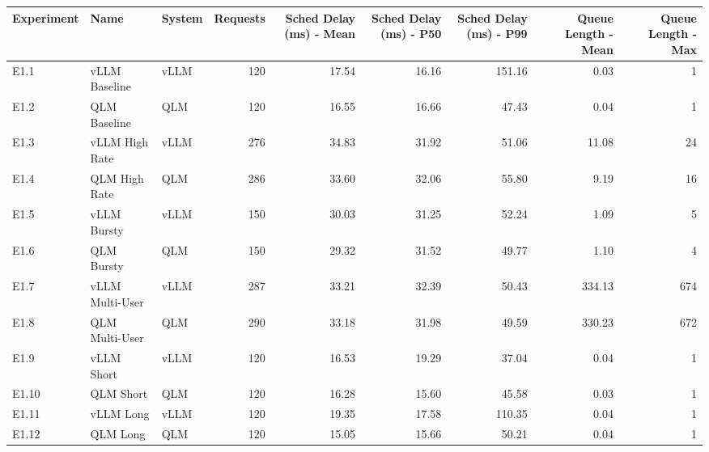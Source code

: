 \begin{tabular}{lllrrrrrr}
\toprule
Experiment & Name & System & Requests & Sched Delay (ms) - Mean & Sched Delay (ms) - P50 & Sched Delay (ms) - P99 & Queue Length - Mean & Queue Length - Max \\
\midrule
E1.1 & vLLM Baseline & vLLM & 120 & 17.54 & 16.16 & 151.16 & 0.03 & 1 \\
E1.2 & QLM Baseline & QLM & 120 & 16.55 & 16.66 & 47.43 & 0.04 & 1 \\
E1.3 & vLLM High Rate & vLLM & 276 & 34.83 & 31.92 & 51.06 & 11.08 & 24 \\
E1.4 & QLM High Rate & QLM & 286 & 33.60 & 32.06 & 55.80 & 9.19 & 16 \\
E1.5 & vLLM Bursty & vLLM & 150 & 30.03 & 31.25 & 52.24 & 1.09 & 5 \\
E1.6 & QLM Bursty & QLM & 150 & 29.32 & 31.52 & 49.77 & 1.10 & 4 \\
E1.7 & vLLM Multi-User & vLLM & 287 & 33.21 & 32.39 & 50.43 & 334.13 & 674 \\
E1.8 & QLM Multi-User & QLM & 290 & 33.18 & 31.98 & 49.59 & 330.23 & 672 \\
E1.9 & vLLM Short & vLLM & 120 & 16.53 & 19.29 & 37.04 & 0.04 & 1 \\
E1.10 & QLM Short & QLM & 120 & 16.28 & 15.60 & 45.58 & 0.03 & 1 \\
E1.11 & vLLM Long & vLLM & 120 & 19.35 & 17.58 & 110.35 & 0.04 & 1 \\
E1.12 & QLM Long & QLM & 120 & 15.05 & 15.66 & 50.21 & 0.04 & 1 \\
\bottomrule
\end{tabular}
